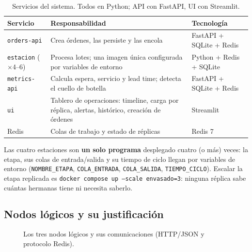 \documentclass[12pt,a4paper]{article}
\begin{document}
\begin{table}[H]
\centering
\caption{Servicios del sistema. Todos en Python; API con FastAPI, UI con Streamlit.}
\small
\begin{tabular}{L{3.2cm} L{6.8cm} L{3.6cm}}
\toprule
\textbf{Servicio} & \textbf{Responsabilidad} & \textbf{Tecnología} \\
\midrule
\texttt{orders-api} & Crea órdenes, las persiste y las encola & FastAPI + SQLite + Redis \\
\texttt{estacion} ($\times$4--6) & Procesa lotes; una imagen única configurada por variables de entorno & Python + Redis + SQLite \\
\texttt{metrics-api} & Calcula espera, servicio y lead time; detecta el cuello de botella & FastAPI + SQLite + Redis \\
\texttt{ui} & Tablero de operaciones: timeline, carga por réplica, alertas, histórico, creación de órdenes & Streamlit \\
Redis & Colas de trabajo y estado de réplicas & Redis 7 \\
\bottomrule
\end{tabular}
\end{table}

Las cuatro estaciones son \textbf{un solo programa} desplegado cuatro (o más)
veces: la etapa, sus colas de entrada/salida y su tiempo de ciclo llegan por
variables de entorno (\texttt{NOMBRE\_ETAPA}, \texttt{COLA\_ENTRADA},
\texttt{COLA\_SALIDA}, \texttt{TIEMPO\_CICLO}). Escalar la etapa replicada es
\texttt{docker compose up --scale envasado=3}: ninguna réplica sabe cuántas
hermanas tiene ni necesita saberlo.

\subsection{Nodos lógicos y su justificación}
\label{sec:nodos}

\begin{figure}[H]
\centering
{}
\caption{Los tres nodos lógicos y sus comunicaciones (HTTP/JSON y protocolo Redis).}
\end{figure}
\end{document}
